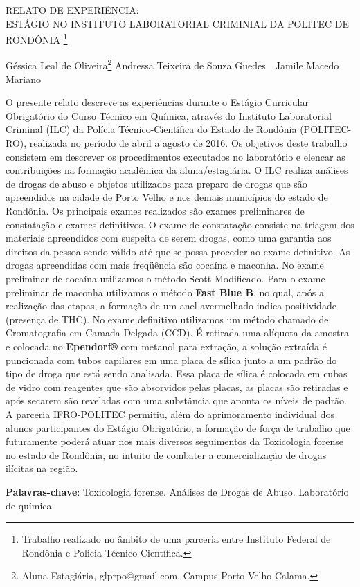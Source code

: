 \documentclass[article,12pt,onesidea,4paper,english,brazil]{abntex2}
\begin{document}
	
	
	\frenchspacing 
	
	\begin{center}
		\LARGE RELATO DE EXPERIÊNCIA:\\ESTÁGIO NO INSTITUTO LABORATORIAL CRIMINIAL DA POLITEC DE RONDÔNIA \footnote{Trabalho realizado no âmbito de uma parceria entre Instituto Federal de Rondônia e Policia Técnico-Científica.}
		
		\normalsize
		Géssica Leal de Oliveira\footnote{Aluna Estagiária, glprpo@gmail.com, Campus Porto Velho Calama.} 
		Andressa Teixeira de Souza Guedes \,\,
		Jamile Macedo Mariano 
		
	\end{center}
	
	\noindent O presente relato descreve as experiências durante o Estágio Curricular Obrigatório do Curso Técnico em Química, através do Instituto Laboratorial Criminal (ILC) da Polícia Técnico-Científica do Estado de Rondônia (POLITEC-RO), realizada no período de abril a agosto de 2016. Os objetivos deste trabalho consistem em descrever os procedimentos executados no laboratório e elencar as contribuições na formação acadêmica da aluna/estagiária. O ILC realiza análises de drogas de abuso e objetos utilizados para preparo de drogas que são apreendidos na cidade de Porto Velho e nos demais municípios do estado de Rondônia. Os principais exames realizados são exames preliminares de constatação e exames definitivos. O exame de constatação consiste na triagem dos materiais apreendidos com suspeita de serem drogas, como uma garantia aos direitos da pessoa sendo válido até que se possa proceder ao exame definitivo. As drogas apreendidas com mais freqüência são cocaína e maconha. No exame preliminar de cocaína utilizamos o método Scott Modificado. Para o exame preliminar de maconha utilizamos o método\textbf{ Fast Blue B}, no qual, após a realização das etapas, a formação de um anel avermelhado indica positividade (presença de THC). No exame definitivo utilizamos um método chamado de Cromatografia em Camada Delgada (CCD). É retirada uma alíquota da amostra e colocada no \textbf{Ependorf®} com metanol para extração, a solução extraída é puncionada com tubos capilares em uma placa de sílica junto a um padrão do tipo de droga que está sendo analisada. Essa placa de sílica é colocada em cubas de vidro com reagentes que são absorvidos pelas placas, as placas são retiradas e após secarem são reveladas com uma substância que aponta os níveis de padrão. A parceria IFRO-POLITEC permitiu, além do aprimoramento individual dos alunos participantes do Estágio Obrigatório, a formação de força de trabalho que futuramente poderá atuar nos mais diversos seguimentos da Toxicologia forense no estado de Rondônia, no intuito de combater a comercialização de drogas ilícitas na região.
	
	\vspace{\onelineskip}
	
	\noindent
	\textbf{Palavras-chave}: Toxicologia forense. Análises de Drogas de Abuso. Laboratório de química.
	
\end{document}
